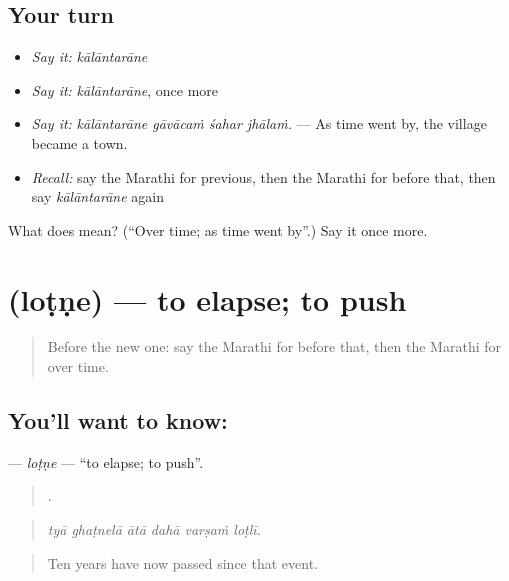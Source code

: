 \subsection*{Your turn}
\begin{itemize}
\raggedright
  \item \emph{Say it:} \emph{kālāntarāne}
  \item \emph{Say it:} \emph{kālāntarāne}, once more
  \item \emph{Say it:} \emph{kālāntarāne gāvācaṁ śahar jhālaṁ.} — As time went by, the village became a town.
  \item \emph{Recall:} say the Marathi for previous, then the Marathi for before that, then say \emph{kālāntarāne} again
\end{itemize}

\begin{tcolorbox}[breakable,colback=teal!4,colframe=teal!35!black,title={Before you move on}]
What does  mean? (\textquotedblleft{}Over time; as time went by\textquotedblright{}.) Say it once more.
\end{tcolorbox}
\section[\texorpdfstring{\mr{लोटणे} (loṭṇe)}{लोटणे (loṭṇe)}]{ (loṭṇe) — to elapse; to push}

\label{lesson:MR-C305-lotne}



\begin{quote}
Before the new one: say the Marathi for before that, then the Marathi for over time.
\end{quote}

\subsection*{You'll want to know: }
\textbf{} — \emph{loṭṇe} — \textquotedblleft{}to elapse; to push\textquotedblright{}.

\begin{quote}
     .
\end{quote}

\begin{quote}
\emph{tyā ghaṭnelā ātā dahā varṣaṁ loṭlī.}
\end{quote}

\begin{quote}
Ten years have now passed since that event.
\end{quote}

